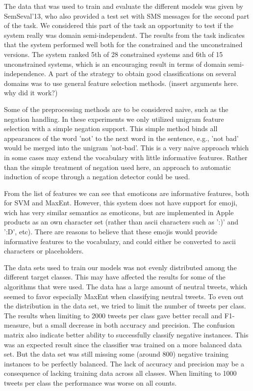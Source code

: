 The data that was used to train and evaluate the different models was given by SemSeval'13, who also provided a test set with SMS messages for the second part of the task. We considered this part of the task an opportunity to test if the system really was domain semi-independent. The results from the task indicates that the system performed well both for the constrained and the unconstrained versions. The system ranked 5th of 28 constrained systems and 6th of 15 unconstrained systems, which is an encouraging result in terms of domain semi-independence. A part of the strategy to obtain good classifications on several domains was to use general feature selection methods. (insert arguments here. why did it work?)

Some of the preprocessing methods are to be considered naive, such as the negation handling. In these experiments we only utilized unigram feature selection with a simple negation support. This simple method binds all appearances of the word 'not' to the next word in the sentence, e.g., 'not bad' would be merged into the unigram 'not-bad'. This is a very naive approach which in some cases may extend the vocabulary with little informative features. Rather than the simple treatment of negation used here, an approach to automatic induction of scope through a negation detector\citep{CouncillEA:10} could be used.

From the list of features we can see that emoticons are informative features, both for SVM and MaxEnt. However, this system does not have support for emoji, wich has very similar semantics as emoticons, but are implemented in Apple products as an own character set (rather than ascii characters such as ':)' and ':D', etc). There are reasons to believe that these emojis would provide informative features to the vocabulary, and could either be converted to ascii characters or placeholders.

The data sets used to train our models was not evenly distributed among the different target classes. This may have affected the results for some of the algorithms that were used. The data has a large amount of neutral tweets, which seemed to favor especially MaxEnt when classifying neutral tweets. To even out the distribution in the data set, we tried to limit the number of tweets per class. The results when limiting to 2000 tweets per class gave better recall and F1-measure, but a small decrease in both accuracy and precision. The confusion matrix also indicate better ability to successfully classify negative instances. This was an expected result since the classifier was trained on a more balanced data set. But the data set was still missing some (around 800) negative training instances to be perfectly balanced. The lack of accuracy and precision may be a consequence of lacking training data across all classes. When limiting to 1000 tweets per class the performance was worse on all counts.


